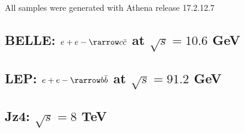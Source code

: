 All samples were generated with Athena release 17.2.12.7
\subsection{BELLE: $e+e- \rarrow c \bar{c}$ at $\sqrt{s}=10.6$ GeV}
\subsubsection{\Herwig}

\subsubsection{\Herwigpp}

\subsubsection{\Pythia}

\subsubsection{\PythiaE}

\subsection{LEP: $e+e- \rarrow b \bar{b}$ at $\sqrt{s}=91.2$ GeV}
\subsubsection{\Herwig}

\subsubsection{\Herwigpp}

\subsubsection{\Pythia}

\subsubsection{\PythiaE}

\subsection{Jz4: $\sqrt{s}=8$ TeV}
\subsubsection{\Herwig}

\subsubsection{\Herwigpp}

\subsubsection{\Pythia}

